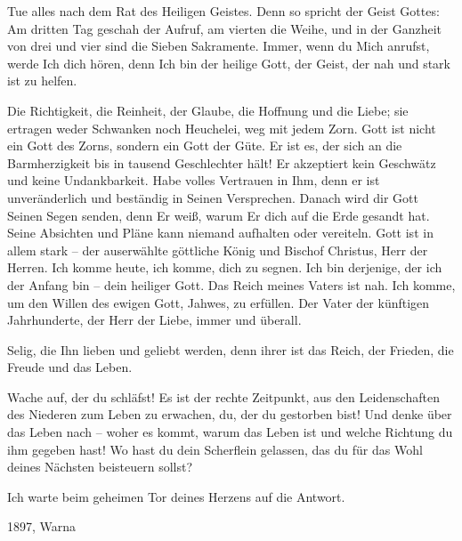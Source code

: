         Tue alles nach dem Rat des Heiligen Geistes. Denn so spricht der Geist Gottes: Am dritten Tag geschah der Aufruf, am vierten die Weihe, und in der Ganzheit von drei und vier sind die Sieben Sakramente. Immer, wenn du Mich anrufst, werde Ich dich hören, denn Ich bin der heilige Gott, der Geist, der nah und stark ist zu helfen. 
        
        Die Richtigkeit, die Reinheit, der Glaube, die Hoffnung und die Liebe; sie ertragen weder Schwanken noch Heuchelei, weg mit jedem Zorn. Gott ist nicht ein Gott des Zorns, sondern ein Gott der Güte. Er ist es, der sich an die Barmherzigkeit bis in tausend Geschlechter hält! Er akzeptiert kein Geschwätz und keine Undankbarkeit. Habe volles Vertrauen in Ihm, denn er ist unveränderlich und beständig in Seinen Versprechen. Danach wird dir Gott Seinen Segen senden, denn Er weiß, warum Er dich auf die Erde gesandt hat. Seine Absichten und Pläne kann niemand aufhalten oder vereiteln. Gott ist in allem stark -- der auserwählte göttliche König und Bischof Christus, Herr der Herren. Ich komme heute, ich komme, dich zu segnen. Ich bin derjenige, der ich der Anfang bin -- dein heiliger Gott. Das Reich meines Vaters ist nah. Ich komme, um den Willen des ewigen Gott, Jahwes, zu erfüllen. Der Vater der künftigen Jahrhunderte, der Herr der Liebe, immer und überall. 
        
        Selig, die Ihn lieben und geliebt werden, denn ihrer ist das Reich, der Frieden, die Freude und das Leben. 
        
        Wache auf, der du schläfst! Es ist der rechte Zeitpunkt, aus den Leidenschaften des Niederen zum Leben zu erwachen, du, der du gestorben bist! Und denke über das Leben nach -- woher es kommt, warum das Leben ist und welche Richtung du ihm gegeben hast! Wo hast du dein Scherflein gelassen, das du für das Wohl deines Nächsten beisteuern sollst?
        
        Ich warte beim geheimen Tor deines Herzens auf die Antwort.
        
        1897, Warna